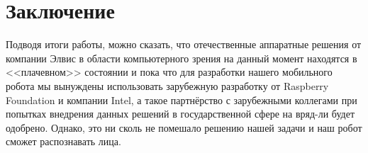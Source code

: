 \documentclass[14pt,a4paper]{scrartcl}
\begin{document}
\begin{comment}
			В данных примерах бутылка была распознана лучше всего, если она была расположена близко к камере. Объект <<стул>> время от времени исчезал, из списка распознанных предметов, а вот диван всё время определялся (хотя в рамке был лишь частично). Монитор (планшетный компьютер) распознался лучше всего: проблем с данным объектом не наблюдалось\cite{bib:Driaba_NIR}. 
			
			\end{comment}

\section{Заключение}

	Подводя итоги работы, можно сказать, что отечественные аппаратные решения от компании Элвис в области компьютерного зрения на данный момент находятся в <<плачевном>> состоянии и пока что для разработки нашего мобильного робота мы вынуждены использовать зарубежную разработку от Raspberry Foundation и компании Intel, а такое партнёрство с зарубежными коллегами при попытках внедрения данных решений в государственной сфере на вряд-ли будет одобрено. Однако, это ни сколь не помешало решению нашей задачи и наш робот сможет распознавать лица.
	
\newpage
\end{document}
